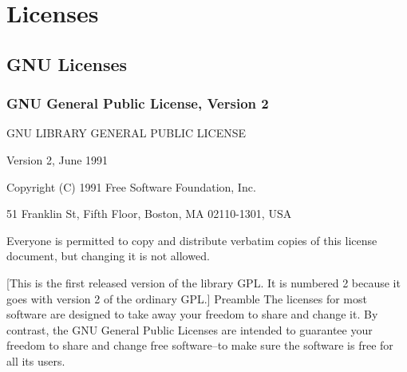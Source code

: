 %
%
%
%
%
%
%
%
%
%


\small
\chapter{Licenses} %
\section{GNU Licenses}



\subsection{GNU General Public License, Version 2}
\label{GPLv2}
\begin{center}
	GNU LIBRARY GENERAL PUBLIC LICENSE
	
	Version 2, June 1991 
\end{center}


\noindent Copyright (C) 1991 Free Software Foundation, Inc.

51 Franklin St, Fifth Floor, Boston, MA  02110-1301, USA


Everyone is permitted to copy and distribute verbatim copies
of this license document, but changing it is not allowed.

[This is the first released version of the library GPL.  It is
numbered 2 because it goes with version 2 of the ordinary GPL.]
Preamble
The licenses for most software are designed to take away your freedom to share and change it. By contrast, the GNU General Public Licenses are intended to guarantee your freedom to share and change free software--to make sure the software is free for all its users. 

